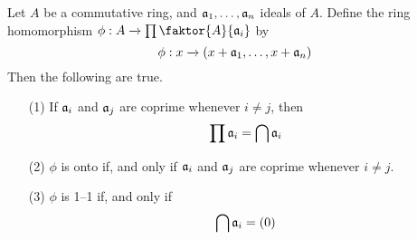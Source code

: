 \begin{lemma}\label{1.9.6}
    Let $A$ be a commutative ring, and $\mathfrak{a}_1, \dots, \mathfrak{a}_n$ ideals of $A$.
    Define the ring homomorphism  $\phi:A \xrightarrow{}
    \prod{\faktor{A}{\af_i}}$ by
    \begin{equation*}
        \phi:x \xrightarrow{} (x+\mathfrak{a}_1, \dots, x+\mathfrak{a}_n)
    \end{equation*}
    Then the following are true.
    \begin{enumerate}
        \item[(1)] If $\mathfrak{a}_i$ and  $\mathfrak{a}_j$ are coprime whenever  $i \neq j$,
            then
            \begin{equation*}
                \prod{\mathfrak{a}_i}=\bigcap{\mathfrak{a}_i}
            \end{equation*}

        \item[(2)] $\phi$ is onto if, and only if  $\mathfrak{a}_i$ and  $\mathfrak{a}_j$ are
            coprime whenever $i \neq j$.

        \item[(3)] $\phi$ is 1--1 if, and only if
            \begin{equation*}
                \bigcap{\mathfrak{a}_i}=(0)
            \end{equation*}
    \end{enumerate}
\end{lemma}
